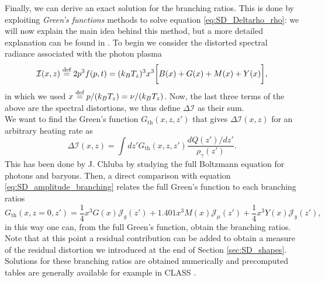 Finally, we can derive an exact solution for the branching ratios. This is done by exploiting \emph{Green's functions} methods to solve equation \eqref{eq:SD_Deltarho_rho}: we will now explain the main idea behind this method, but a more detailed explanation can be found in \cite{Lucca_2020}. To begin we consider the distorted spectral radiance associated with the photon plasma
$$\mathcal{I}(x,z)\stackrel{\text{def}}{=} 2p^3f(p,t)=(k_BT_z)^3x^3\bigg[B(x)+G(x)+M(x)+Y(x)\bigg],$$
in which we used $x\stackrel{\text{def}}{=} p/(k_BT_z)=\nu/(k_BT_z)$.
Now, the last three terms of the above are the spectral distortions, we thus define $\Delta \mathcal{I}$ as their sum.\\
We want to find the Green's function $G_{\text{th}}(x,z,z')$ that gives $\Delta \mathcal{I}(x,z)$ for an arbitrary heating rate as
$$\Delta \mathcal{I}(x,z)=\int dz'G_{\text{th}}(x,z,z')\frac{dQ(z')/dz'}{\rho_\gamma(z')}.$$
This has been done by J. Chluba \cite{Chluba_Green} by studying the full Boltzmann equation for photons and baryons. Then, a direct comparison with equation \eqref{eq:SD_amplitude_branching} relates the full Green's function to each branching ratios
$$G_{\text{th}}(x,z=0,z')=\frac{1}{4}x^3G(x)\mathcal{J}_g(z')+1.401x^3M(x)\mathcal{J}_\mu(z')+\frac{1}{4}x^3Y(x)\mathcal{J}_y(z'),$$ in this way one can, from the full Green's function, obtain the branching ratios. Note that at this point a residual contribution can be added to obtain a measure of the residual distortion we introduced at the end of Section \ref{sec:SD_shapes}. Solutions for these branching ratios are obtained numerically and precomputed tables are generally available for example in CLASS \cite{CLASS}.